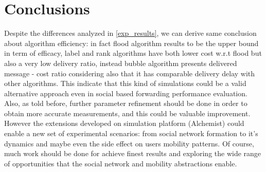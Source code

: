 \section{Conclusions}
\label{conclusions}

Despite the differences analyzed in \ref{exp_results}, we can derive same conclusion about algorithm efficiency: in fact flood algorithm results to be the upper bound in term of efficacy, label and rank algorithms have both lower cost w.r.t flood but also a very low delivery ratio, instead bubble algorithm presents delivered message - cost ratio considering also that it has comparable delivery delay with other algorithms. This indicate that this kind of simulations could be a valid alternative approach even in social based forwarding performance evaluation. Also, as told before, further parameter refinement should be done in order to obtain more accurate measurements, and this could be valuable improvement.\\
However the extensions developed on simulation platform (Alchemist) could enable a new set of experimental scenarios: from social network formation to it's dynamics and maybe even the side effect on users mobility patterns. Of course, much work should be done for achieve finest results and exploring the wide range of opportunities that the social network and mobility abstractions enable.  

